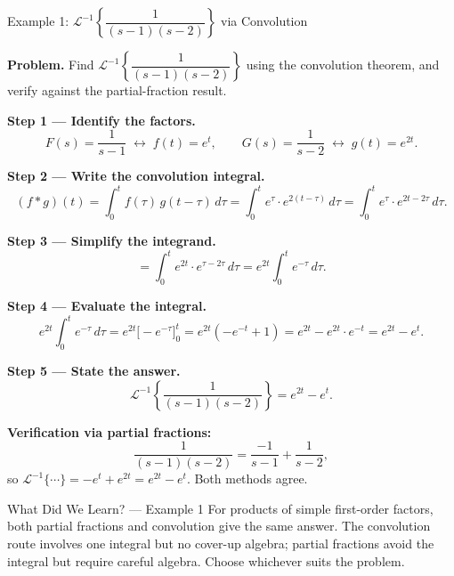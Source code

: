 \documentclass[12pt,a4paper]{article}
\begin{document}
\begin{infobox}{Example 1: $\mathcal{L}^{-1}\!\left\{\dfrac{1}{(s-1)(s-2)}\right\}$ via Convolution}

\textbf{Problem.} Find $\mathcal{L}^{-1}\!\left\{\dfrac{1}{(s-1)(s-2)}\right\}$ using the
convolution theorem, and verify against the partial-fraction result.

\medskip
\textbf{Step 1 --- Identify the factors.}
\[
  F(s) = \frac{1}{s-1} \;\longleftrightarrow\; f(t) = e^{t}, \qquad
  G(s) = \frac{1}{s-2} \;\longleftrightarrow\; g(t) = e^{2t}.
\]

\textbf{Step 2 --- Write the convolution integral.}
\[
  (f*g)(t) = \int_0^t f(\tau)\,g(t-\tau)\,d\tau
           = \int_0^t e^{\tau}\cdot e^{2(t-\tau)}\,d\tau
           = \int_0^t e^{\tau}\cdot e^{2t-2\tau}\,d\tau.
\]

\textbf{Step 3 --- Simplify the integrand.}
\[
  = \int_0^t e^{2t}\cdot e^{\tau-2\tau}\,d\tau
  = e^{2t}\int_0^t e^{-\tau}\,d\tau.
\]

\textbf{Step 4 --- Evaluate the integral.}
\[
  e^{2t}\int_0^t e^{-\tau}\,d\tau
  = e^{2t}\Big[-e^{-\tau}\Big]_0^t
  = e^{2t}\!\left(-e^{-t}+1\right)
  = e^{2t} - e^{2t}\cdot e^{-t}
  = e^{2t} - e^{t}.
\]

\textbf{Step 5 --- State the answer.}
\[
  \mathcal{L}^{-1}\!\left\{\frac{1}{(s-1)(s-2)}\right\} = e^{2t} - e^{t}.
\]

\textbf{Verification via partial fractions:}
\[
  \frac{1}{(s-1)(s-2)} = \frac{-1}{s-1} + \frac{1}{s-2},
\]
so $\mathcal{L}^{-1}\{\cdots\} = -e^{t}+e^{2t} = e^{2t}-e^{t}$. \checkmark\; Both methods agree.
\end{infobox}

\begin{learnbox}{What Did We Learn? --- Example 1}
For products of simple first-order factors, both partial fractions and convolution give the
same answer. The convolution route involves one integral but no cover-up algebra; partial
fractions avoid the integral but require careful algebra. Choose whichever suits the problem.
\end{learnbox}
\end{document}
